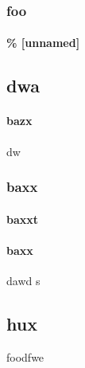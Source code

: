\documentclass[]{article}
\begin{document}
\section{foo}




\subsection*{\% [unnamed]}



\begin{center}
\part*{dwa}





\subsection{bazx} dw





\section{baxx}



\subsection{baxxt}




\end{center}




\subsection{baxx}



dawd
s


\chapter{hux}




foodfwe
\end{document}
